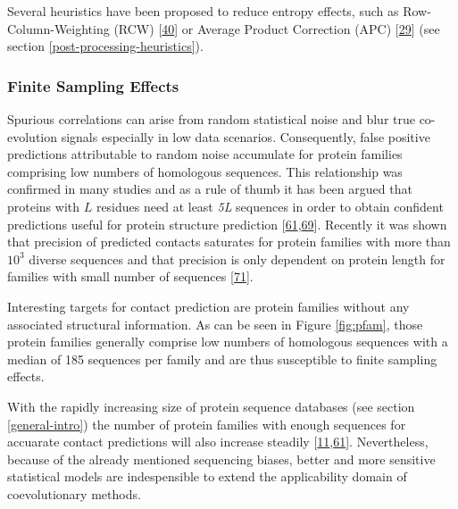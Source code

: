 \documentclass[12pt,a4paper,twoside]{book}
\theoremstyle{definition}
\theoremstyle{definition}
\theoremstyle{remark}
\begin{document}
Several heuristics have been proposed to reduce entropy effects, such as
Row-Column-Weighting (RCW)
{[}\protect\hyperlink{ref-Gouveia_Oliveira2007}{40}{]} or Average
Product Correction (APC) {[}\protect\hyperlink{ref-Dunn2008}{29}{]} (see
section \ref{post-processing-heuristics}).

\subsubsection*{Finite Sampling Effects}\label{finite-sampling-effects}

Spurious correlations can arise from random statistical noise and blur
true co-evolution signals especially in low data scenarios.
Consequently, false positive predictions attributable to random noise
accumulate for protein families comprising low numbers of homologous
sequences. This relationship was confirmed in many studies and as a rule
of thumb it has been argued that proteins with \(L\) residues need at
least \emph{5L} sequences in order to obtain confident predictions
useful for protein structure prediction
{[}\protect\hyperlink{ref-Kamisetty2013}{61},\protect\hyperlink{ref-Marks2012}{69}{]}.
Recently it was shown that precision of predicted contacts saturates for
protein families with more than \(10^3\) diverse sequences and that
precision is only dependent on protein length for families with small
number of sequences {[}\protect\hyperlink{ref-Anishchenko2017}{71}{]}.

Interesting targets for contact prediction are protein families without
any associated structural information. As can be seen in Figure
\ref{fig:pfam}, those protein families generally comprise low numbers of
homologous sequences with a median of 185 sequences per family and are
thus susceptible to finite sampling effects.

With the rapidly increasing size of protein sequence databases (see
section \ref{general-intro}) the number of protein families with enough
sequences for accuarate contact predictions will also increase steadily
{[}\protect\hyperlink{ref-TheUniProtConsortium2013}{11},\protect\hyperlink{ref-Kamisetty2013}{61}{]}.
Nevertheless, because of the already mentioned sequencing biases, better
and more sensitive statistical models are indespensible to extend the
applicability domain of coevolutionary methods.
\end{document}
